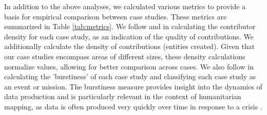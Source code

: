 In addition to the above analyses, we calculated various metrics to provide a basis for empirical comparison between case studies. These metrics are summarized in Table \ref{tab:metrics}. We follow \textcite{anderson_crowd_2018} and \textcite{haklay_how_2010} in calculating the contributor density for each case study, as an indication of the quality of contributions. We additionally calculate the density of contributions (entities created). Given that our case studies encompass areas of different sizes, these density calculations normalize values, allowing for better comparison across cases. We also follow \textcite{dittus_mass_2017} in calculating the 'burstiness' of each case study and classifying each case study as an event or mission. The burstiness measure provides insight into the dynamics of data production and is particularly relevant in the context of humanitarian mapping, as data is often produced very quickly over time in response to a crisis \parencite{dittus_mass_2017}. 

